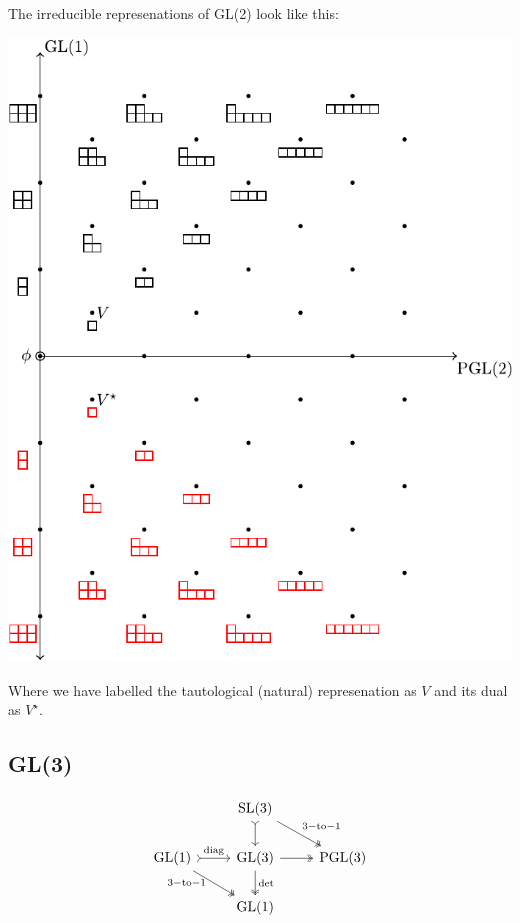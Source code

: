 \documentclass[11pt,oneside]{article}
\newcommand{\GL}{\mathrm{GL}}
\newcommand{\SL}{\mathrm{SL}}
\newcommand{\PGL}{\mathrm{PGL}}
\begin{document}
The irreducible represenations of GL(2) look like this:
\begin{center}
\includegraphics[scale=0.8]{images/gl2.pdf}
\end{center}
Where we have labelled the tautological (natural) represenation as $V$
and its dual as $V^{\star}.$

\subsection{GL(3)}

\[
\begin{tikzcd}
    &  
    \SL(3) \arrow[rightarrowtail]{d}\arrow[two heads]{dr}{\mathrm{3-to-1}} &  \\
    \GL(1) \arrow[rightarrowtail]{r}{\mathrm{diag}} 
           \arrow[two heads]{dr}[below,left]{\mathrm{3-to-1\ }}  &  
    \GL(3) \arrow[two heads]{r}\arrow[two heads]{d}{\mathrm{det}}  &  \PGL(3)     \\
    &  \GL(1)             &     \\
\end{tikzcd}
\]
\end{document}
